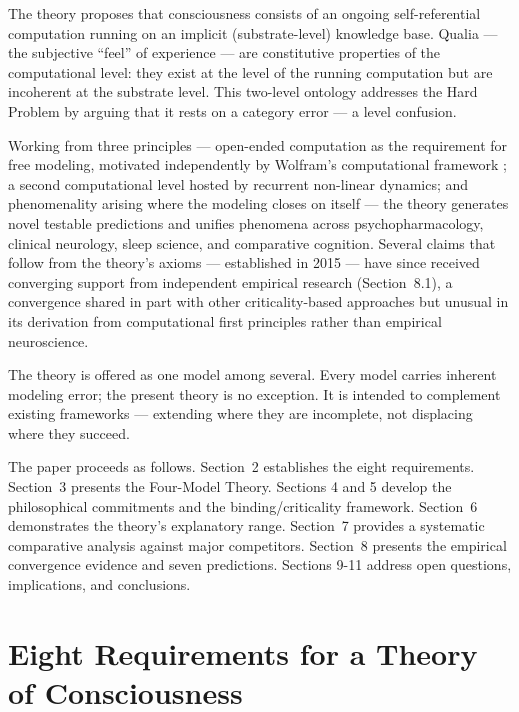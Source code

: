 \documentclass[12pt]{article}
\newcommand{\rev}[1]{#1}
\newcommand{\revstart}{}
\newcommand{\revend}{}
\begin{document}
The theory proposes that consciousness consists of an ongoing self-referential computation running on an implicit (substrate-level) knowledge base. Qualia --- the subjective ``feel'' of experience --- are constitutive properties of the computational level: they exist at the level of the running computation but are incoherent at the substrate level. This two-level ontology addresses the Hard Problem by arguing that it rests on a category error --- a level confusion.

Working from three principles --- open-ended computation as the requirement for free modeling, \rev{motivated} independently by Wolfram's computational framework \citep{Wolfram2002}; a second computational level hosted by recurrent non-linear dynamics; and phenomenality arising where the modeling closes on itself --- the theory generates novel testable predictions and unifies phenomena across psychopharmacology, clinical neurology, sleep science, and comparative cognition. {\revstart Several claims that follow from the theory's axioms --- established in 2015 --- have since received converging support from independent empirical research (Section~8.1), a convergence shared in part with other criticality-based approaches but unusual in its derivation from computational first principles rather than empirical neuroscience.\revend}

The theory is offered as one model among several. Every model carries inherent modeling error; the present theory is no exception. It is intended to complement existing frameworks --- extending where they are incomplete, not displacing where they succeed.

The paper proceeds as follows. Section~2 establishes the eight requirements. Section~3 presents the Four-Model Theory. Sections 4 and 5 develop the philosophical commitments and the binding/criticality framework. Section~6 demonstrates the theory's explanatory range. Section~7 provides a systematic comparative analysis against major competitors. Section~8 presents the empirical convergence evidence and seven predictions. Sections 9-11 address open questions, implications, and conclusions.



\section{Eight Requirements for a Theory of Consciousness}
\end{document}
